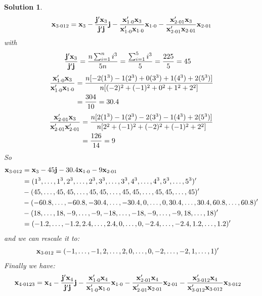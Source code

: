 \documentclass[11pt]{article}
\newtheorem{sol}{Solution}
\begin{document}
\begin{sol}
\begin{align*}
	{\bf x}_{3\cdot 012} &= {\bf x}_3 - \frac{{\bf j}'{\bf x}_3}{{\bf j}'{\bf j}}{\bf j} - \frac{{\bf x}'_{1\cdot 0}{\bf x}_3}{{\bf x}'_{1\cdot 0}{\bf x}_{1\cdot 0}}{\bf x}_{1\cdot 0} - \frac{{\bf x}'_{2\cdot 01}{\bf x}_3}{{\bf x}'_{2\cdot 01}{\bf x}_{2\cdot 01}}{\bf x}_{2\cdot 01}\\
\end{align*}
with
\begin{align*}
	\frac{{\bf j}'{\bf x}_3}{{\bf j}'{\bf j}} &= \frac{n\sum_{i = 1}^{n}i^3}{5n} = \frac{\sum_{i = 1}^{5}i^3}{5} = \frac{225}{5} = 45
\end{align*}
\begin{align*}
	\frac{{\bf x}_{1\cdot 0}'{\bf x}_3}{{\bf x}'_{1\cdot 0}{\bf x}_{1\cdot 0}} &= 
	\frac{n[-2(1^3)-1(2^3)+ 0(3^3) + 1(4^3)+ 2(5^3)]}{n[(-2)^2 + (-1)^2 + 0^2 + 1^2 + 2^2]}\\
	&= \frac{304}{10} = 30.4
\end{align*}
\begin{align*}
	\frac{{\bf x}'_{2\cdot 01}{\bf x}_3}{{\bf x}'_{2\cdot 01}{\bf x}'_{2\cdot 01}} &= 
	\frac{n[2(1^3) -1(2^3)-2(3^3)-1(4^3) + 2(5^3)]}{n[2^2 + (-1)^2 + (-2)^2 + (-1)^2 + 2^2]}\\
	&= \frac{126}{14} = 9
\end{align*}
So
\begin{align*}
	{\bf x}_{3\cdot 012} &= {\bf x}_3 - 45{\bf j} - 30.4{\bf x}_{1\cdot 0} - 9{\bf x}_{2\cdot 01}\\
	&= (1^3, \ldots, 1^3, 2^3, \ldots, 2^3, 3^3, \ldots, 3^3, 4^3, \ldots, 4^3, 5^3, \ldots, 5^3)'\\
	&- (45, \ldots, 45, 45, \ldots, 45, 45, \ldots, 45, 45, \ldots, 45, 45, \ldots, 45)'\\
	&- (-60.8, \ldots, -60.8, -30.4, \ldots, -30.4, 0, \ldots, 0, 30.4, \ldots, 30.4, 60.8, \ldots, 60.8)'\\
	&- (18, \ldots, 18, -9, \ldots, -9, -18, \ldots, -18, -9, \ldots, -9, 18, \ldots, 18)'\\
	&= (-1.2, \ldots, -1.2, 2.4, \ldots, 2.4, 0, \ldots, 0, -2.4, \ldots, -2.4, 1.2, \ldots, 1.2)'
\end{align*}
and we can rescale it to:
\begin{align*}
	{\bf x}_{3\cdot 012} &= (-1, \ldots, -1, 2, \ldots, 2, 0, \ldots, 0, -2, \ldots, -2, 1, \ldots, 1)'
\end{align*}
Finally we have:
\begin{align*}
	{\bf x}_{4\cdot 0123} &= {\bf x}_4 - \frac{{\bf j}'{\bf x}_4}{{\bf j}'{\bf j}}{\bf j} - \frac{{\bf x}'_{1\cdot 0}{\bf x}_4}{{\bf x}'_{1\cdot 0}{\bf x}_{1\cdot 0}}{\bf x}_{1\cdot 0} - \frac{{\bf x}'_{2\cdot 01}{\bf x}_4}{{\bf x}'_{2\cdot 01}{\bf x}_{2\cdot 01}}{\bf x}_{2\cdot 01} - \frac{{\bf x}'_{3\cdot 012}{\bf x}_4}{{\bf x}'_{3\cdot 012}{\bf x}_{3\cdot 012}}{\bf x}_{3\cdot 012}

\end{align*}
\end{sol}
\end{document}
